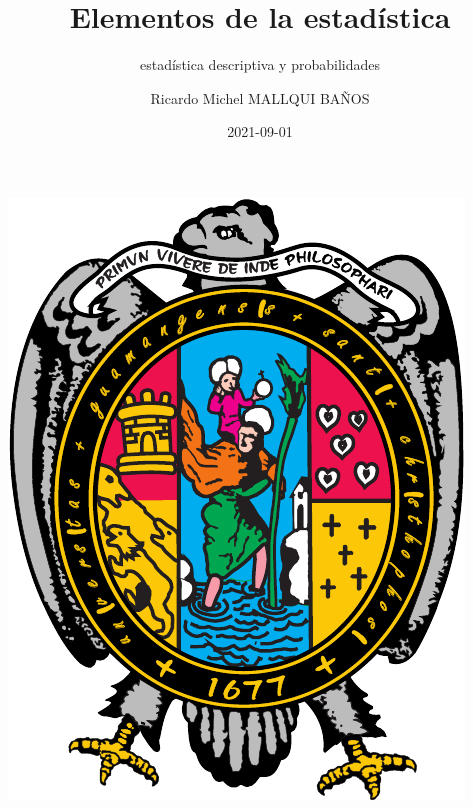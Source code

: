 \documentclass[10pt,]{krantz}
\title{Elementos de la estadística}
\subtitle{estadística descriptiva y probabilidades}
\author{Ricardo Michel MALLQUI BAÑOS}
\date{2021-09-01}
\let\oldincludegraphics\includegraphics
\renewcommand\includegraphics[2][]{%
  \oldincludegraphics[scale=0.85]{#2}
}
\theoremstyle{definition}
\theoremstyle{definition}
\theoremstyle{definition}
\theoremstyle{definition}
\theoremstyle{remark}
\begin{document}
\maketitle

\thispagestyle{empty}
\begin{center}
\includegraphics{U.pdf}
\end{center}


{
\hypersetup{linkcolor=}
\setcounter{tocdepth}{2}
\tableofcontents
}
\listoftables
\listoffigures
\newcommand{\N}{\mathbb{N}}
\newcommand{\R}{\mathbb{R}}
\newcommand{\CC}{\mathbb{C}}
\newcommand{\I}{\mathbb{I}}
\newcommand{\f}{\mathbb{f}}
\newcommand{\X}{\mathbb{X}}
\newcommand{\D}{\mathbb{D}}
\newcommand{\Z}{\mathbb{Z}}
\newcommand{\Q}{\mathbb{Q}}
\newcommand{\norm}[1]{\left\Vert#1\right\Vert}
\newcommand{\abs}[1]{\left\vert#1\right\vert}
\newcommand{\set}[1]{\left\{#1\right\}}
\newcommand{\seq}[1]{\left<#1\right>}
\newcommand{\co}[1]{\left[#1\right]}
\newcommand{\cc}[1]{\left(#1\right)}
\newcommand{\J}{\mathcal{J}}
\newcommand{\K}{\mathcal{K}}
\newcommand{\M}{\mathcal{M}}
\newcommand{\F}{\mathcal{F}}
\end{document}
